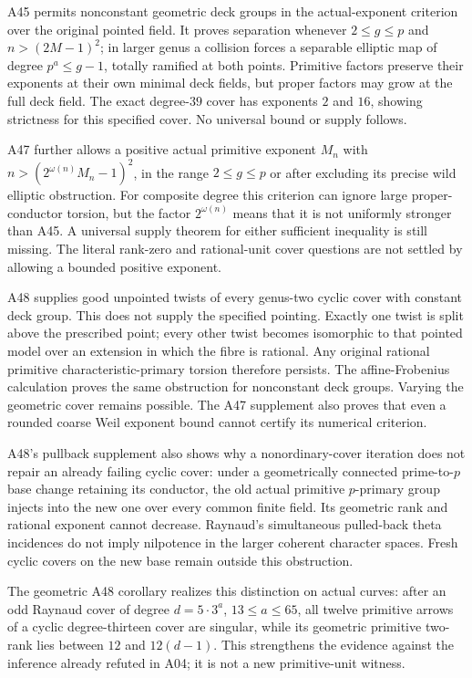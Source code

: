 \documentclass[11pt,a4paper]{article}
\begin{document}
A45 permits nonconstant geometric deck groups in the actual-exponent
criterion over the original pointed field. It proves separation whenever
$2\le g\le p$ and $n>(2M-1)^2$; in larger genus a collision forces a
separable elliptic map of degree $p^a\le g-1$, totally ramified at both
points. Primitive factors preserve their exponents at their own minimal
deck fields, but proper factors may grow at the full deck field. The
exact degree-$39$ cover has exponents $2$ and $16$, showing strictness
for this specified cover. No universal bound or supply follows.

A47 further allows a positive actual primitive exponent $M_n$ with
$n>(2^{\omega(n)}M_n-1)^2$, in the range $2\le g\le p$ or after
excluding its precise wild elliptic obstruction. For composite degree
this criterion can ignore large proper-conductor torsion, but the factor
$2^{\omega(n)}$ means that it is not uniformly stronger than A45.
A universal supply theorem for either sufficient inequality is still
missing. The literal rank-zero and rational-unit cover questions are
not settled by allowing a bounded positive exponent.

A48 supplies good unpointed twists of every genus-two cyclic cover
with constant deck group. This does not supply the specified pointing.
Exactly one twist is split above the prescribed point; every other twist
becomes isomorphic to that pointed model over an extension in which the
fibre is rational. Any original rational primitive characteristic-primary
torsion therefore persists. The affine-Frobenius calculation proves the
same obstruction for nonconstant deck groups. Varying the geometric cover
remains possible. The A47 supplement also proves that even a rounded
coarse Weil exponent bound cannot certify its numerical criterion.

A48's pullback supplement also shows why a nonordinary-cover iteration
does not repair an already failing cyclic cover: under a geometrically
connected prime-to-$p$ base change retaining its conductor, the old actual
primitive $p$-primary group injects into the new one over every common
finite field. Its geometric rank and rational exponent cannot decrease.
Raynaud's simultaneous pulled-back theta incidences do not imply
nilpotence in the larger coherent character spaces. Fresh cyclic covers
on the new base remain outside this obstruction.

The geometric A48 corollary realizes this distinction on actual curves:
after an odd Raynaud cover of degree $d=5\cdot3^a$, $13\le a\le65$,
all twelve primitive arrows of a cyclic degree-thirteen cover are singular,
while its geometric primitive two-rank lies between $12$ and $12(d-1)$.
This strengthens the evidence against the inference already refuted in A04;
it is not a new primitive-unit witness.
\end{document}
